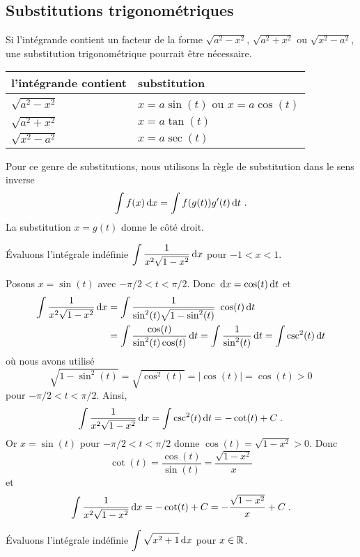 {\subsection{Substitutions trigonométriques \eng}

Si l'intégrande contient un facteur de la forme $\sqrt{a^2-x^2}$,
$\sqrt{a^2+x^2}$ ou $\sqrt{x^2-a^2}$, une substitution trigonométrique
pourrait être nécessaire.

\begin{center}
\begin{tabular}{l|l}
l'intégrande contient & substitution \\
\hline
\rule[4pt]{0em}{1em} $\sqrt{a^2-x^2}$ & $x=a\sin(t)$ ou $x=a\cos(t)$ \\
\rule[4pt]{0em}{1em} $\sqrt{a^2+x^2}$ & $x=a\tan(t)$ \\
\rule[4pt]{0em}{1em} $\sqrt{x^2-a^2}$ & $x=a\sec(t)$
\end{tabular}
\end{center}

Pour ce genre de substitutions, nous utilisons la règle de substitution
dans le sens inverse
\[
\int f(x)  \,\mathrm{d}x = \int f(g(t))g'(t) \,\mathrm{d}t  \ .
\]
La substitution $x=g(t)$ donne le côté droit.

\begin{egg}
Évaluons l'intégrale indéfinie
$\displaystyle \int \frac{1}{x^2\sqrt{1-x^2}} \,\mathrm{d}x$ pour
$-1 < x < 1$.

Posons $x=\sin(t)$ avec $-\pi/2 < t < \pi/2$.  Donc
$\,\mathrm{d}x = \cos(t)\,\mathrm{d}t$ et
\begin{align*}
\int \frac{1}{x^2\sqrt{1-x^2}} \,\mathrm{d}x &=
\int \frac{1}{\sin^2(t) \sqrt{1- \sin^2(t)}} \ \cos(t) \,\mathrm{d}t \\
&= \int \frac{\cos(t)}{\sin^2(t) \cos(t)} \,\mathrm{d}t
= \int \frac{1}{\sin^2(t)} \,\mathrm{d}t = \int \csc^2(t) \,\mathrm{d}t
\end{align*}
où nous avons utilisé
\[
\sqrt{1- \sin^2(t)} = \sqrt{\cos^2(t)} = |\cos(t)| = \cos(t) > 0
\]
pour $-\pi/2<t<\pi/2$.  Ainsi,
\[
\int \frac{1}{x^2\sqrt{1-x^2}} \,\mathrm{d}x = \int \csc^2(t) \,\mathrm{d}t
= - \cot(t) + C \; .
\]
Or $x=\sin(t)$ pour $-\pi/2<t<\pi/2$ donne $\cos(t) = \sqrt{1-x^2} >0$.
Donc
\[
\cot(t) = \frac{\cos(t)}{\sin(t)} = \frac{\sqrt{1-x^2}}{x}
\]
et
\[
\int \frac{1}{x^2\sqrt{1-x^2}} \,\mathrm{d}x
= -\cot(t) + C = -\frac{\sqrt{1-x^2}}{x} + C \; .
\]
\end{egg}

\begin{egg}
Évaluons l'intégrale indéfinie
$\displaystyle \int \sqrt{x^2+1} \,\mathrm{d}x$ pour $x \in \mathbb{R}$.


\end{egg}}
